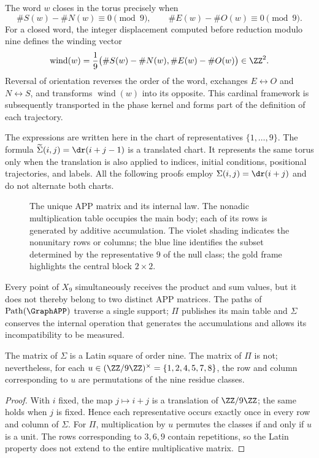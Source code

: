 The word \(w\) closes in the torus precisely when
\[
\#S(w)-\#N(w)\equiv0\pmod9,
\qquad
\#E(w)-\#O(w)\equiv0\pmod9.
\]
For a closed word, the integer displacement computed before reduction
modulo nine defines the winding vector
\[
 \operatorname{wind}(w)=\frac1{9}
 \bigl(\#S(w)-\#N(w),\#E(w)-\#O(w)\bigr)\in\ZZ^2.
\]
Reversal of orientation reverses the order of the word, exchanges
\(E\leftrightarrow O\) and \(N\leftrightarrow S\), and transforms \(\operatorname{wind}(w)\) into its
opposite. This cardinal framework is subsequently transported in the phase
kernel and forms part of the definition of each trajectory.

The expressions are written here in the chart of representatives
\(\{1,\ldots,9\}\). The formula
\(\widetilde\Sigma(i,j)=\dr(i+j-1)\) is a translated chart. It represents the
same torus only when the translation is also applied to indices, initial
conditions, positional trajectories, and labels. All the following proofs employ
\(\Sigma(i,j)=\dr(i+j)\) and do not alternate both charts.

\begin{figure}[H]
\centering
\resizebox{\textwidth}{!}{}
\caption{The unique APP matrix and its internal law. The nonadic multiplication table occupies the main body; each of its rows is generated by additive accumulation. The violet shading indicates the nonunitary rows or columns; the blue line identifies the subset determined by the representative \(9\) of the null class; the gold frame highlights the central block \(2\times2\).}
\label{fig:app-ortograma}
\end{figure}

Every point of \(X_9\) simultaneously receives the product and sum values,
but it does not thereby belong to two distinct APP matrices. The paths of
\(\operatorname{Path}(\GraphAPP)\) traverse a single support; \(\Pi\)
publishes its main table and \(\Sigma\) conserves the internal operation that
generates the accumulations and allows its incompatibility to be measured.

\begin{proposition}
\label{prop:app-latina-unidades}
The matrix of \(\Sigma\) is a Latin square of order nine. The matrix of
\(\Pi\) is not; nevertheless, for each
\(u\in(\ZZ/9\ZZ)^\times=\{1,2,4,5,7,8\}\), the row and column
corresponding to \(u\) are permutations of the nine residue classes.
\end{proposition}

\begin{proof}
With \(i\) fixed, the map \(j\mapsto i+j\) is a translation of \(\ZZ/9\ZZ\); the same holds when \(j\) is fixed. Hence each representative occurs exactly once in every row and column of \(\Sigma\). For \(\Pi\), multiplication by \(u\) permutes the classes if and only if \(u\) is a unit. The rows corresponding to \(3,6,9\) contain repetitions, so the Latin property does not extend to the entire multiplicative matrix.
\end{proof}

